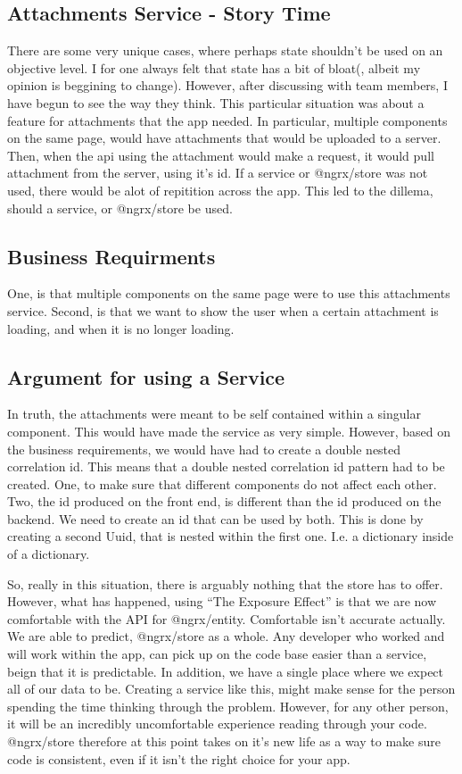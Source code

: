 \subsection{ Attachments Service - Story Time }
There are some very unique cases, where perhaps state shouldn't be used on an
objective level. I for one always felt that state has a bit of bloat(, albeit my
opinion is beggining to change). However, after discussing with team members,
I have begun to see the way they think. This particular situation was about a
feature for attachments that the app needed. In particular, multiple components
on the same page, would have attachments that would be uploaded to a server.
Then, when the api using the attachment would make a request, it would pull
attachment from the server, using it's id. If a service or @ngrx/store was not
used, there would be alot of repitition across the app. This led to the dillema,
should a service, or @ngrx/store be used.

\subsection{ Business Requirments }
One, is that multiple components on the same page were to use this attachments
service. Second, is that we want to show the user when a certain attachment is
loading, and when it is no longer loading.

\subsection{ Argument for using a Service }
In truth, the attachments were meant to be self contained within a singular
component. This would have made the service as very simple. However, based on
the business requirements, we would have had to create a double nested
correlation id. This means that a double nested correlation id pattern had to be
created. One, to make sure that different components do not affect each other.
Two, the id produced on the front end, is different than the id produced on the
backend. We need to create an id that can be used by both. This is done by
creating a second Uuid, that is nested within the first one. I.e. a dictionary
inside of a dictionary.

So, really in this situation, there is arguably nothing that the store has to
offer. However, what has happened, using ``The Exposure Effect'' is that we are
now comfortable with the API for @ngrx/entity. Comfortable isn't accurate
actually. We are able to predict, @ngrx/store as a whole. Any developer who
worked and will work within the app, can pick up on the code base easier than
a service, beign that it is predictable. In addition, we have a single place
where we expect all of our data to be. Creating a service like this, might make
sense for the person spending the time thinking through the problem. However,
for any other person, it will be an incredibly uncomfortable experience reading
through your code. @ngrx/store therefore at this point takes on it's new life
as a way to make sure code is consistent, even if it isn't the right choice for
your app.

